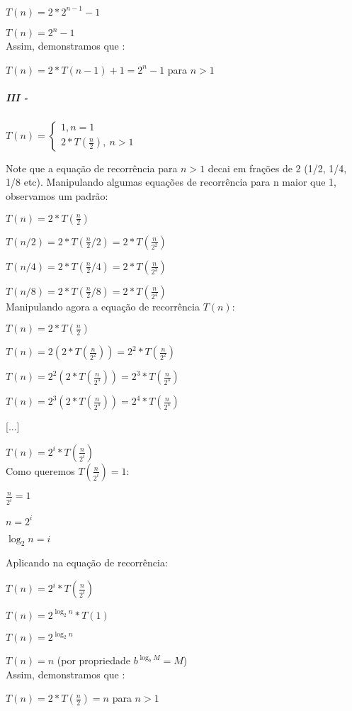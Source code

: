 \documentclass[a4paper, twocolumn]{article}
\theoremstyle{definition}
\begin{document}
$T(n) = 2*2^{n-1} - 1$

$T(n) = 2^{n} - 1$\\

Assim, demonstramos que :

$T(n) = 2*T(n-1) + 1 = 2^{n} - 1$ para $n > 1$


\subparagraph{III - } {$T(n) = \begin{cases} 
		1, n  = 1\\
		2*T(\frac{n}{2}), \ n > 1
	\end{cases}$}

Note que a equação de recorrência para $n>1$ decai em frações de 2 (1/2, 1/4, 1/8 etc). Manipulando algumas equações de recorrência para n maior que 1, observamos um padrão:

$T(n) = 2*T(\frac{n}{2})$

$T(n/2) = 2*T(\frac{n}{2}/2) = 2*T(\frac{n}{2^2})$

$T(n/4) = 2*T(\frac{n}{2}/4) = 2*T(\frac{n}{2^3})$

$T(n/8) = 2*T(\frac{n}{2}/8) = 2*T(\frac{n}{2^4})$ \\

Manipulando agora a equação de recorrência $T(n)$:

$T(n) = 2*T(\frac{n}{2})$

$T(n) = 2(2*T(\frac{n}{2^2})) = 2^2*T(\frac{n}{2^2})$

$T(n) = 2^2(2*T(\frac{n}{2^3})) = 2^3*T(\frac{n}{2^3})$

$T(n) = 2^3(2*T(\frac{n}{2^4})) = 2^4*T(\frac{n}{2^4})$ 

[...]

$T(n) = 2^i*T(\frac{n}{2^i})$ \\

Como queremos $T(\frac{n}{2^i}) = 1$:

$\frac{n}{2^i} = 1$

$n = 2^i$

$\log_{2}n = i$

Aplicando na equação de recorrência:

$T(n) = 2^i*T(\frac{n}{2^i})$

$T(n) = 2^{\log_{2}n} * T(1)$

$T(n) = 2^{\log_{2}n}$

$T(n) = n$ (por propriedade $b^{\log_bM} = M$) \\

Assim, demonstramos que :

$T(n) = 2*T(\frac{n}{2}) = n$ para $n > 1$
\end{document}
